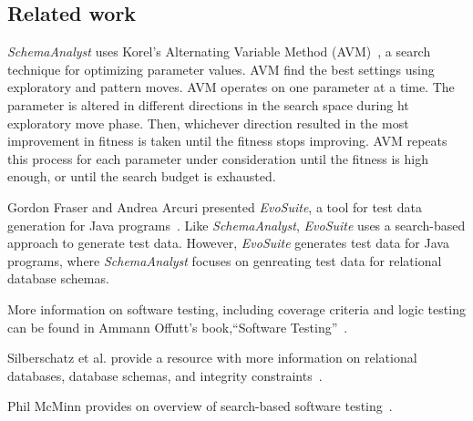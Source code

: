 \subsection{Related work}
\textit{SchemaAnalyst} uses Korel's Alternating Variable Method (AVM)~\cite{Korel:AVM},
a search technique for optimizing parameter values. AVM find the best settings using 
exploratory and pattern moves. AVM operates on one parameter at a time. The parameter is
altered in different directions in the search space during ht exploratory move phase.  Then,
whichever direction resulted in the most improvement in fitness is taken until the fitness stops 
improving. AVM repeats this process for each parameter under consideration until the fitness is
high enough, or until the search budget is exhausted.

Gordon Fraser and Andrea Arcuri presented \textit{EvoSuite}, a tool for test data generation for
Java programs~\cite{Fraser2011evosuite}.
Like \textit{SchemaAnalyst}, \textit{EvoSuite} uses a search-based approach 
to generate test data. However, \textit{EvoSuite} generates test data for Java programs, where
\textit{SchemaAnalyst} focuses on genreating test data for relational database schemas.

More information on software testing, including coverage criteria and logic testing
can be found in Ammann Offutt's book,``Software Testing''~\cite{ammann2008}.

Silberschatz et al. provide a resource with more information on relational databases,
database schemas, and integrity constraints~\cite{databasebook}.

Phil McMinn provides on overview of search-based software testing~\cite{STVR:STVR294}.
